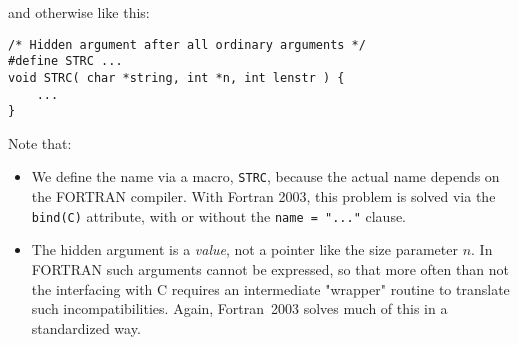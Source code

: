 \noindent and otherwise like this:

\begin{verbatim}
/* Hidden argument after all ordinary arguments */
#define STRC ...
void STRC( char *string, int *n, int lenstr ) {
    ...
}
\end{verbatim}

Note that:
\begin{itemize}
\item
We define the name via a macro, \verb+STRC+, because the actual name depends on the FORTRAN compiler.
With Fortran 2003, this problem is solved via the \verb+bind(C)+ attribute, with or without the \verb+name = "..."+ clause.
\item
The hidden argument is a \emph{value}, not a pointer like the size parameter $n$. In FORTRAN such arguments
cannot be expressed, so that more often than not the interfacing with C requires an intermediate "wrapper" routine
to translate such incompatibilities. Again, Fortran~2003 solves much of this in a standardized way.
\end{itemize}
